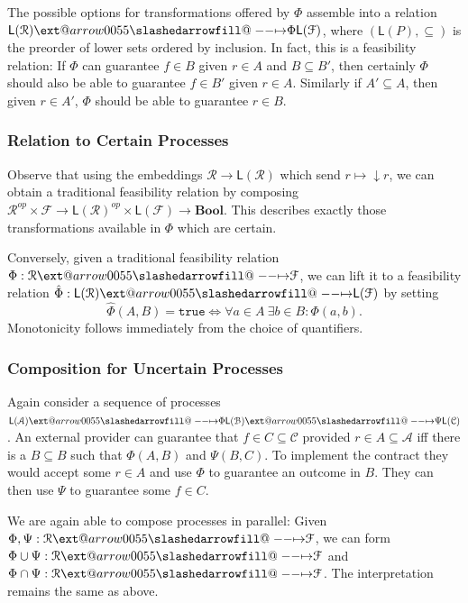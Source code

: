 \documentclass[12pt]{article}
\makeatletter
\theoremstyle{definition}
\theoremstyle{plain}
\theoremstyle{plain}
\theoremstyle{plain}
\theoremstyle{plain}
\theoremstyle{remark}
\theoremstyle{remark}
\newcommand{\mc}[1]{\mathcal{#1}}
\newcommand{\sub}{\subseteq}
\newcommand{\low}{\mathsf{L}}
\def\slashedarrowfill@#1#2#3#4#5{%
	$\m@th\thickmuskip0mu\medmuskip\thickmuskip\thinmuskip\thickmuskip
	\relax#5#1\mkern-7mu%
	\cleaders\hbox{$#5\mkern-2mu#2\mkern-2mu$}\hfill
	\mathclap{#3}\mathclap{#2}%
	\cleaders\hbox{$#5\mkern-2mu#2\mkern-2mu$}\hfill
	\mkern-7mu#4$%
}
\def\rightslashedarrowfill@{%
	\slashedarrowfill@\relbar\relbar\mapstochar\rightarrow}
\newcommand\xslashedrightarrow[2][]{%
	\ext@arrow 0055{\rightslashedarrowfill@}{#1}{#2}}
\makeatother
\begin{document}
The possible options for transformations offered by $\Phi$ assemble into a relation $\low(\mc{R}) \xslashedrightarrow{\Phi} \low(\mc{F})$, where $(\low(P), \sub)$ is the preorder of lower sets ordered by inclusion. In fact, this is a feasibility relation: If $\Phi$ can guarantee $f \in B$ given $r \in A$ and $B \sub B'$, then certainly $\Phi$ should also be able to guarantee $f \in B'$ given $r \in A$. Similarly if $A' \sub A$, then given $r \in A'$, $\Phi$ should be able to guarantee $r \in B$.

\subsubsection{Relation to Certain Processes}
Observe that using the embeddings $\mc{R} \rightarrow \low(\mc{R})$ which send $r \mapsto \downarrow r$, we can obtain a traditional feasibility relation by composing $\mc{R}^{op} \times \mc{F} \rightarrow \low(\mc{R})^{op} \times \low(\mc{F}) \rightarrow \mathbf{Bool}$. This describes exactly those transformations available in $\Phi$ which are certain.

Conversely, given a traditional feasibility relation $\Phi: \mc{R} \xslashedrightarrow{} \mc{F}$, we can lift it to a feasibility relation $\hat \Phi: \low(\mc{R}) \xslashedrightarrow{} \low(\mc{F})$ by setting 
$$\hat\Phi(A,B) = \mathtt{true} \Leftrightarrow \forall a \in A \: \exists b \in B: \Phi(a,b).$$
Monotonicity follows immediately from the choice of quantifiers.

\subsubsection{Composition for Uncertain Processes}
Again consider a sequence of processes $\low(\mc{A}) \xslashedrightarrow{\Phi} \low(\mc{B}) \xslashedrightarrow{\Psi} \low(\mc{C})$. An external provider can guarantee that $f \in C \sub \mc{C}$ provided $r \in A \sub \mc{A}$ iff there is a $B \sub{B}$ such that $\Phi(A,B)$ and $\Psi(B,C)$. To implement the contract they would accept some $r \in A$ and use $\Phi$ to guarantee an outcome in $B$. They can then use $\Psi$ to guarantee some $f \in C$.

We are again able to compose processes in parallel: Given $\Phi,\Psi :\mc{R} \xslashedrightarrow{} \mc{F}$, we can form $\Phi \cup \Psi :\mc{R} \xslashedrightarrow{} \mc{F}$ and $\Phi \cap \Psi :\mc{R} \xslashedrightarrow{} \mc{F}$. The interpretation remains the same as above.
\end{document}
